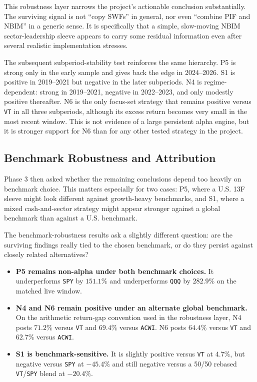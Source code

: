 \documentclass[conference]{IEEEtran}
\begin{document}
This robustness layer narrows the project's actionable conclusion substantially. The surviving signal is not ``copy SWFs'' in general, nor even ``combine PIF and NBIM'' in a generic sense. It is specifically that a simple, slow-moving NBIM sector-leadership sleeve appears to carry some residual information even after several realistic implementation stresses.

The subsequent subperiod-stability test reinforces the same hierarchy. P5 is strong only in the early sample and gives back the edge in 2024--2026. S1 is positive in 2019--2021 but negative in the later subperiods. N4 is regime-dependent: strong in 2019--2021, negative in 2022--2023, and only modestly positive thereafter. N6 is the only focus-set strategy that remains positive versus \texttt{VT} in all three subperiods, although its excess return becomes very small in the most recent window. This is not evidence of a large persistent alpha engine, but it is stronger support for N6 than for any other tested strategy in the project.

\subsection{Benchmark Robustness and Attribution}

Phase 3 then asked whether the remaining conclusions depend too heavily on benchmark choice. This matters especially for two cases: P5, where a U.S. 13F sleeve might look different against growth-heavy benchmarks, and S1, where a mixed cash-and-sector strategy might appear stronger against a global benchmark than against a U.S. benchmark.

The benchmark-robustness results ask a slightly different question: are the surviving findings really tied to the chosen benchmark, or do they persist against closely related alternatives?
\begin{itemize}[leftmargin=1.4em]
    \item \textbf{P5 remains non-alpha under both benchmark choices.} It underperforms \texttt{SPY} by $151.1\%$ and underperforms \texttt{QQQ} by $282.9\%$ on the matched live window.
    \item \textbf{N4 and N6 remain positive under an alternate global benchmark.} On the arithmetic return-gap convention used in the robustness layer, N4 posts $71.2\%$ versus \texttt{VT} and $69.4\%$ versus \texttt{ACWI}. N6 posts $64.4\%$ versus \texttt{VT} and $62.7\%$ versus \texttt{ACWI}.
    \item \textbf{S1 is benchmark-sensitive.} It is slightly positive versus \texttt{VT} at $4.7\%$, but negative versus \texttt{SPY} at $-45.4\%$ and still negative versus a 50/50 rebased \texttt{VT}/\texttt{SPY} blend at $-20.4\%$.
\end{itemize}
\end{document}
